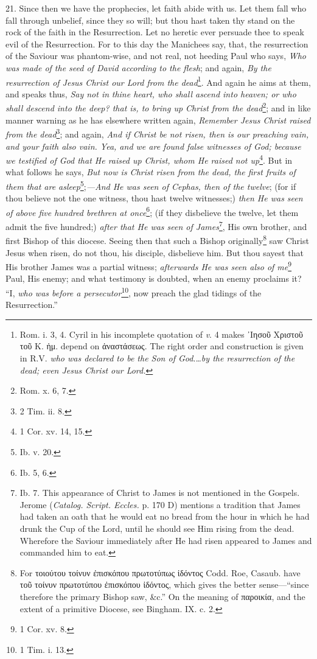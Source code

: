 21. Since then we have the prophecies, let faith abide with us. Let them fall who fall through unbelief, since they so will; but thou hast taken thy stand on the rock of the faith in the Resurrection. Let no heretic ever persuade thee to speak evil of the Resurrection. For to this day the Manichees say, that, the resurrection of the Saviour was phantom-wise, and not real, not heeding Paul who says, \emph{Who was made of the seed of David according to the flesh}; and again, \emph{By the resurrection of Jesus Christ our Lord from the dead}\footnote{Rom. i. 3, 4. Cyril in his incomplete quotation of \emph{v}. 4 makes \textgreek{᾽Ιησοῦ Χριστοῦ τοῦ Κ. ἡμ.} depend on \textgreek{ἀναστάσεως}. The right order and construction is given in R.V. \emph{who was declared to be the Son of God}.\emph{…by the resurrection of the dead; even Jesus Christ our Lord.}}. And again he aims at them, and speaks thus, \emph{Say not in} \emph{thine heart, who shall ascend into heaven; or who shall descend into the deep? that is, to bring up Christ from the dead}\footnote{Rom. x. 6, 7.}; and in like manner warning as he has elsewhere written again, \emph{Remember Jesus Christ raised from the dead}\footnote{2 Tim. ii. 8.}; and again, \emph{And if Christ be not risen, then is our preaching vain, and your faith also vain. Yea, and we are found false witnesses of God; because we testified of God that He raised up Christ, whom He raised not up}\footnote{1 Cor. xv. 14, 15.}. But in what follows he says, \emph{But now is Christ risen from the dead, the first fruits of them that are asleep}\footnote{Ib. v. 20.};\emph{—And He was seen of Cephas, then of the twelve}; (for if thou believe not the one witness, thou hast twelve witnesses;) \emph{then He was seen of above five hundred brethren at once}\footnote{Ib. 5, 6.}; (if they disbelieve the twelve, let them admit the five hundred;) \emph{after that He was seen of James}\footnote{Ib. 7. This appearance of Christ to James is not mentioned in the Gospels. Jerome (\emph{Catalog. Script. Eccles.} p. 170 D) mentions a tradition that James had taken an oath that he would eat no bread from the hour in which he had drunk the Cup of the Lord, until he should see Him rising from the dead. Wherefore the Saviour immediately after He had risen appeared to James and commanded him to eat.}, His own brother, and first Bishop of this diocese. Seeing then that such a Bishop originally\footnote{For \textgreek{τοιούτου τοίνυν ἐπισκόπου πρωτοτύπως ἰδόντος} Codd. Roe, Casaub. have \textgreek{τοῦ τοίνυν πρωτοτύπου ἐπισκόπου ἰδόντος}, which gives the better sense—“since therefore the primary Bishop saw, \&c.” On the meaning of \textgreek{παροικία}, and the extent of a primitive Diocese, see Bingham. IX. c. 2.} saw Christ Jesus when risen, do not thou, his disciple, disbelieve him. But thou sayest that His brother James was a partial witness; \emph{afterwards He was seen also of me}\footnote{1 Cor. xv. 8.} Paul, His enemy; and what testimony is doubted, when an enemy proclaims it? “I, \emph{who was before a persecutor}\footnote{1 Tim. i. 13.}, now preach the glad tidings of the Resurrection.”

